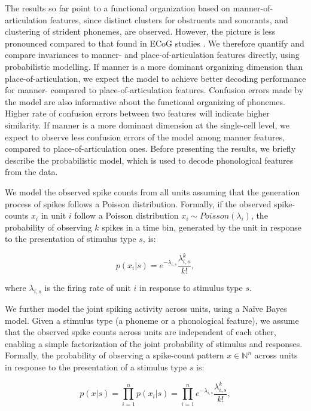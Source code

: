 The results so far point to a functional organization based on manner-of-articulation features, since distinct clusters for obstruents and sonorants, and clustering of strident phonemes, are observed. However, the picture is less pronounced compared to that found in ECoG studies \citep{Mesgarani2014}. We therefore quantify and compare invariances to manner- and place-of-articulation features directly, using probabilistic modelling. If manner is a more dominant organizing dimension than place-of-articulation, we expect the model to achieve better decoding performance for manner- compared to place-of-articulation features. Confusion errors made by the model are also informative about the functional organizing of phonemes. Higher rate of confusion errors between two features will indicate higher similarity. If manner is a more dominant dimension at the single-cell level, we expect to observe less confusion errors of the model among manner features, compared to place-of-articulation ones. Before presenting the results, we briefly describe the probabilistic model, which is used to decode phonological features from the data.

We model the observed spike counts from all units assuming that the generation process of spikes follows a Poisson distribution. Formally, if the observed spike-counts $x_i$ in unit $i$ follow a Poisson distribution $x_i \sim Poisson(\lambda_i)$, the probability of observing $k$ spikes in a time bin, generated by the unit in response to the presentation of stimulus type $s$, is:

\begin{equation}
    p(x_i|s)=e^{-\lambda_{i,s}}\frac{\lambda_{i,s}^k}{k!},
\end{equation}

where $\lambda_{i,s}$ is the firing rate of unit $i$ in response to stimulus type $s$. 

We further model the joint spiking activity across units, using a Na\"{i}ve Bayes model. Given a stimulus type (a phoneme or a phonological feature), we assume that the observed spike counts across units are independent of each other, enabling a simple factorization of the joint probability of stimulus and responses. Formally, the probability of observing a spike-count pattern $x \in \mathbb{N}^n$ across units in response to the presentation of a stimulus type $s$ is:

\begin{equation}
    p(x|s)=\prod_{i=1}^n{p(x_i |s)}=\prod_{i=1}^n{e^{-\lambda_{i,s}}\frac{\lambda_{i,s}^k}{k!}},
\end{equation}

